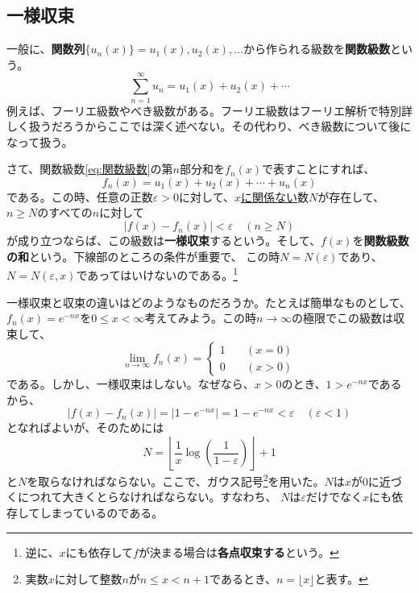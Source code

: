 \documentclass[a4j,dvipdfmx]{jsarticle}
\begin{document}
            \subsection{一様収束}
                一般に、\textbf{関数列}$\{u_n(x)\}=u_1(x),u_2(x),\dots$から作られる級数を\textbf{関数級数}という。
                \begin{equation}
                    \sum_{n=1}^{\infty}u_n=u_1(x)+u_2(x)+\cdots\label{eq:関数級数}
                \end{equation}
                例えば、フーリエ級数やべき級数がある。フーリエ級数はフーリエ解析で特別詳しく扱うだろうからここでは深く述べない。その代わり、べき級数について後になって扱う。
 
                さて、関数級数\eqref{eq:関数級数}の第$n$部分和を$f_n(x)$で表すことにすれば、
                \begin{equation}
                    f_n(x)=u_1(x)+u_2(x)+\cdots+u_n(x)\label{eq:関数級数のn部分和}
                \end{equation}
                である。この時、任意の正数$\varepsilon>0$に対して、\underline{$x$に関係ない}数$N$が存在して、$n\geq N$のすべての$n$に対して
                \begin{equation}
                    |f(x)-f_n(x)|<\varepsilon\quad (n\geq N)\label{eq:一様収束}
                \end{equation}
                が成り立つならば、この級数は\textbf{一様収束}するという。そして、$f(x)$を\textbf{関数級数の和}という。下線部のところの条件が重要で、
                この時$N=N(\varepsilon)$であり、$N=N(\varepsilon,x)$であってはいけないのである。\footnote{逆に、$x$にも依存して$f$が決まる場合は\textbf{各点収束する}という。}

                一様収束と収束の違いはどのようなものだろうか。たとえば簡単なものとして、$f_n(x) = e^{-nx}$を$0\leq x< \infty$考えてみよう。この時$n\to \infty$の極限でこの級数は収束して、
                \begin{equation*}
                    \lim_{n\to\infty}f_n(x)=\begin{cases}
                        1\quad &(x=0)\\0\quad &(x>0)
                    \end{cases}
                \end{equation*}
                である。しかし、一様収束はしない。なぜなら、$x>0$のとき、$1>e^{-nx}$であるから、
                \begin{equation*}
                    |f(x)-f_n(x)|=|1-e^{-nx}|=1-e^{-nx}<\varepsilon\quad (\varepsilon < 1)
                \end{equation*}
                となればよいが、そのためには
                \begin{equation*}
                    N=\left\lfloor\frac{1}{x}\log\left(\frac{1}{1-\varepsilon}\right)\right\rfloor+1
                \end{equation*}
                と$N$を取らなければならない。ここで、ガウス記号\footnote{実数$x$に対して整数$n$が$n\leq x<n+1$であるとき、$n=\lfloor x\rfloor$と表す。}を用いた。$N$は$x$が$0$に近づくにつれて大きくとらなければならない。すなわち、
                $N$は$\varepsilon$だけでなく$x$にも依存してしまっているのである。
            \clearpage
\end{document}
